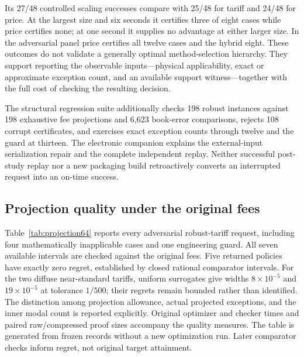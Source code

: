 \documentclass[11pt,letterpaper]{article}
\theoremstyle{definition}\newtheorem{remark}[theorem]{Remark}
\begin{document}
Its 27/48 controlled scaling successes compare with 25/48 for tariff and 24/48 for price. At the largest size and six seconds it certifies three of eight cases while price certifies none; at one second it supplies no advantage at either larger size. In the adversarial panel price certifies all twelve cases and the hybrid eight. These outcomes do not validate a generally optimal method-selection hierarchy. They support reporting the observable inputs---physical applicability, exact or approximate exception count, and an available support witness---together with the full cost of checking the resulting decision.

The structural regression suite additionally checks 198 robust instances against 198 exhaustive fee projections and 6,623 book-error comparisons, rejects 108 corrupt certificates, and exercises exact exception counts through twelve and the guard at thirteen. The electronic companion explains the external-input serialization repair and the complete independent replay. Neither successful post-study replay nor a new packaging build retroactively converts an interrupted request into an on-time success.

\subsection{Projection quality under the original fees}\label{sec:projection-study64}
Table~\ref{tab:projection64} reports every adversarial robust-tariff request, including four mathematically inapplicable cases and one engineering guard. All seven available intervals are checked against the original fees. Five returned policies have exactly zero regret, established by closed rational comparator intervals. For the two diffuse near-standard tariffs, uniform surrogates give widths $8\times10^{-5}$ and $19\times10^{-5}$ at tolerance $1/500$; their regrets remain bounded rather than identified. The distinction among projection allowance, actual projected exceptions, and the inner modal count is reported explicitly. Original optimizer and checker times and paired raw/compressed proof sizes accompany the quality measures. The table is generated from frozen records without a new optimization run. Later comparator checks inform regret, not original target attainment.
\end{document}
